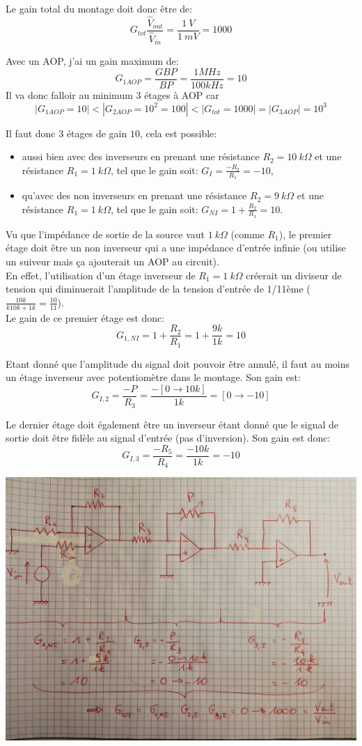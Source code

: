 {
  Le gain total du montage doit donc être de:
$$G_{tot}\frac{\hat{V}_{out}}{\hat{V}_{in}}=\frac{1\ V}{1\ mV}=1000$$

Avec un AOP, j'ai un gain maximum de:
$$G_{1AOP}=\frac{GBP}{BP}=\frac{1MHz}{100kHz}=10$$
Il va donc falloir au minimum 3 étages à AOP car
$$|G_{1AOP}=10| < |G_{2AOP}=10^2=100| < |G_{tot}=1000| = |G_{3AOP}|=10^3$$

Il faut donc 3 étages de gain $10$, cela est possible:
\begin{itemize}
    \item aussi bien avec des inverseurs en prenant une résistance $R_2=10\ k\Omega$ et une résistance $R_1=1\ k\Omega$, tel que le gain soit: $G_I=\frac{-R_2}{R_1}=-10$,
    \item qu'avec des non inverseurs en prenant une résistance $R_2=9\ k\Omega$ et une résistance $R_1=1\ k\Omega$, tel que le gain soit: $G_{NI}=1+\frac{R_2}{R_1}=10$.
\end{itemize}

Vu que l'impédance de sortie de la source vaut $1\ k\Omega$ (comme $R_1$), le premier étage doit être un non inverseur qui a une impédance d'entrée infinie (ou utilise un suiveur mais ça ajouterait un AOP au circuit).\\
En effet, l'utilisation d'un étage inverseur de $R_1=1\ k\Omega$ créerait un diviseur de tension qui diminuerait l'amplitude de la tension d'entrée de 1/11ème ($\frac{10k}{k10k+1k}=\frac{10}{11}$).\\
Le gain de ce premier étage est donc:
$$G_{1,NI}=1+\frac{R_2}{R_1}=1+\frac{9k}{1k}=10$$

Etant donné que l'amplitude du signal doit pouvoir être annulé, il faut au moins un étage inverseur avec potentiomètre dans le montage. Son gain est:
$$G_{I,2}=\frac{-P}{R_3}=\frac{-[0\rightarrow 10k]}{1k}=[0\rightarrow -10]$$

Le dernier étage doit également être un inverseur étant donné que le signal de sortie doit être fidèle au signal d'entrée (pas d'inversion). Son gain est donc:
$$G_{I,3}=\frac{-R_5}{R_4}=\frac{-10k}{1k}=-10$$


\begin{center}
\includegraphics[width=.9\textwidth]{AOP2.jpg}
\end{center}

}



\endinput
